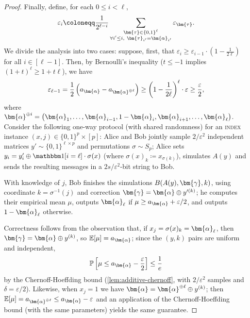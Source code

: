 \documentclass[a4paper,UKenglish,cleveref, autoref, thm-restate]{lipics-v2021}
\theoremstyle{definition}
\newcommand{\E}{\mathbb E}
\renewcommand{\P}{\mathbb P}
\newcommand{\eps}{\varepsilon}
\newcommand{\bitset}{\{0,1\}}
\newcommand{\indexproblem}{\normalfont\textsc{index}\xspace}
\newcommand{\pcommitlength}{p}
\newcommand{\pcommitstring}{y}
\newcommand{\chf}{\mathbbm 1}
\def\fe#1{
    \ifnum#1=1
        \alpha
    \else
    \ifnum#1=2
        \beta
    \else
    \ifnum#1=3
        \gamma
    \fi\fi\fi
}
\begin{document}
\begin{proof}
    Finally, define, for each $0 \leq i < \ell$,
    \begin{equation*}
        \eps_i \coloneqq \frac1{2^{\ell - i}} \sum_{\substack{\bm{\tau} \in \bitset^{\ell} \\ \forall i' \leq i, ~ \bm{\tau}_{i'} = \bm{\fe1}_{i'}}} \eps_{\bm{\tau}}.
    \end{equation*}
    We divide the analysis into two cases: suppose, first, that $\eps_i \geq \eps_{i - 1} \cdot \left(1 - \frac1{2\ell}\right)$ for all $i \in [\ell - 1]$. Then, by Bernoulli's inequality ($t \leq -1$ implies $(1 + t)^{\ell} \geq 1 + t\ell$), we have
    \begin{equation*}
        \eps_{\ell - 1} = \frac12 \left(a_{\bm{\fe1}} - a_{\bm{\fe1}^{\oplus \ell}}\right) \geq \left(1 - \frac1{2\ell}\right)^{\ell} \cdot \eps \geq \frac{\eps}{2},
    \end{equation*}
    where $\bm{\fe1}^{\oplus i} = \left(\bm{\fe1}_1, \ldots, \bm{\fe1}_{i - 1}, 1 - \bm{\fe1}_i, \bm{\fe1}_{i + 1}, \ldots, \bm{\fe1}_\ell\right)$. Consider the following one-way protocol (with shared randomness) for an \indexproblem instance $(x, j) \in \bitset^\pcommitlength \times [\pcommitlength]$: Alice and Bob jointly sample $2/\eps^2$ independent matrices $\pcommitstring' \sim \bitset^{\ell \times \pcommitlength}$ and permutations $\sigma \sim S_\pcommitlength$; Alice sets $\pcommitstring_i = \pcommitstring'_i \oplus \chf[i = \ell] \cdot \sigma(x)$ (where $\sigma(x)_k \coloneqq x_{\sigma(k)}$), simulates $A(\pcommitstring)$ and sends the resulting messages in a $2s/\eps^2$-bit string to Bob.
    
    With knowledge of $j$, Bob finishes the simulations $B(A(\pcommitstring), \bm{\fe3}, k)$, using coordinate $k = \sigma^{-1}(j)$ and correction $\bm{\fe3} = \bm{\fe1} \oplus \pcommitstring'^{(k)}$; he computes their empirical mean $\mu$, outputs $\bm{\fe1}_\ell$ if $\mu \geq a_{\bm{\fe1}} + \eps/2$, and outputs $1 - \bm{\fe1}_\ell$ otherwise.
    
    Correctness follows from the observation that, if $x_j = \sigma(x)_k = \bm{\fe1}_\ell$, then $\bm{\fe3} = \bm{\fe1} \oplus \pcommitstring^{(k)}$, so $\E[\mu] = a_{\bm{\fe1}}$; since the $(\pcommitstring, k)$ pairs are uniform and independent,
    \begin{equation*}
        \P\left[\mu \leq a_{\bm{\fe1}} - \frac{\eps}{2}\right] \leq \frac1 e
    \end{equation*}
    by the Chernoff-Hoeffding bound (\cref{lem:additive-chernoff}, with $2/\eps^2$ samples and $\delta = \eps/2$). Likewise, when $x_j = 1$ we have $\bm{\fe1} = \bm{\fe1}^{\oplus \ell} \oplus \pcommitstring^{(k)}$; then $\E[\mu] = a_{\bm{\fe1}^{\oplus \ell}} \leq a_{\bm{\fe1}} - \eps$ and an application of the Chernoff-Hoeffding bound (with the same parameters) yields the same guarantee.
    

\end{proof}
\end{document}
